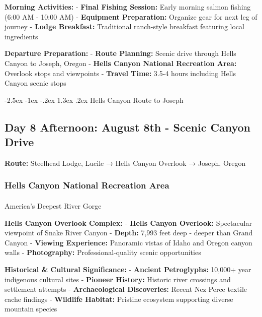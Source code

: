 \documentclass[
  11pt,
  letterpaper,
  DIV=10,
  numbers=noendperiod]{scrartcl}
\makeatletter
\let\oldparagraph\paragraph
\renewcommand{\paragraph}{
    \@ifstar
      \xxxParagraphStar
      \xxxParagraphNoStar
  }
\newcommand{\xxxParagraphStar}[1]{\oldparagraph*{#1}\mbox{}}
\newcommand{\xxxParagraphNoStar}[1]{\oldparagraph{#1}\mbox{}}
\renewcommand{\section}{\@startsection{section}{1}{\z@}%
  {-2.5ex \@plus -1ex \@minus -.2ex}%
  {1.3ex \@plus .2ex}%
  {\normalfont\fontsize{16}{19}\bfseries\color{twinpeaksred}}}
\makeatother
\begin{document}
\textbf{Morning Activities:} - \textbf{Final Fishing Session:} Early
morning salmon fishing (6:00 AM - 10:00 AM) - \textbf{Equipment
Preparation:} Organize gear for next leg of journey - \textbf{Lodge
Breakfast:} Traditional ranch-style breakfast featuring local
ingredients

\textbf{Departure Preparation:} - \textbf{Route Planning:} Scenic drive
through Hells Canyon to Joseph, Oregon - \textbf{Hells Canyon National
Recreation Area:} Overlook stops and viewpoints - \textbf{Travel Time:}
3.5-4 hours including Hells Canyon scenic stops

\newpage

\section{Hells Canyon Route to
Joseph}\label{hells-canyon-route-to-joseph}

\subsection{Day 8 Afternoon: August 8th - Scenic Canyon
Drive}\label{day-8-afternoon-august-8th---scenic-canyon-drive}

\textbf{Route:} Steelhead Lodge, Lucile → Hells Canyon Overlook →
Joseph, Oregon

\subsubsection{Hells Canyon National Recreation
Area}\label{hells-canyon-national-recreation-area}

\paragraph{America's Deepest River
Gorge}\label{americas-deepest-river-gorge}

\textbf{Hells Canyon Overlook Complex:} - \textbf{Hells Canyon
Overlook:} Spectacular viewpoint of Snake River Canyon - \textbf{Depth:}
7,993 feet deep - deeper than Grand Canyon - \textbf{Viewing
Experience:} Panoramic vistas of Idaho and Oregon canyon walls -
\textbf{Photography:} Professional-quality scenic opportunities

\textbf{Historical \& Cultural Significance:} - \textbf{Ancient
Petroglyphs:} 10,000+ year indigenous cultural sites - \textbf{Pioneer
History:} Historic river crossings and settlement attempts -
\textbf{Archaeological Discoveries:} Recent Nez Perce textile cache
findings - \textbf{Wildlife Habitat:} Pristine ecosystem supporting
diverse mountain species
\end{document}
